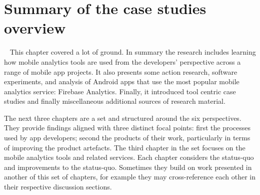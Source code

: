 
\section{Summary of the case studies overview}~\label{case-study-overview-summary}
This chapter covered a lot of ground. In summary the research includes learning how mobile analytics tools are used from the developers' perspective across a range of mobile app projects. It also presents some action research, software experiments, and analysis of Android apps that use the most popular mobile analytics service: Firebase Analytics. Finally, it introduced tool centric case studies and finally miscellaneous additional sources of research material.

The next three chapters are a set and structured around the six perspectives. They provide findings aligned with three distinct focal points: first the processes used by app developers; second the products of their work, particularly in terms of improving the product artefacts. The third chapter in the set focuses on the mobile analytics tools and related services. Each chapter considers the status-quo and improvements to the status-quo. Sometimes they build on work presented in another of this set of chapters, for example they may cross-reference each other in their respective discussion sections.

